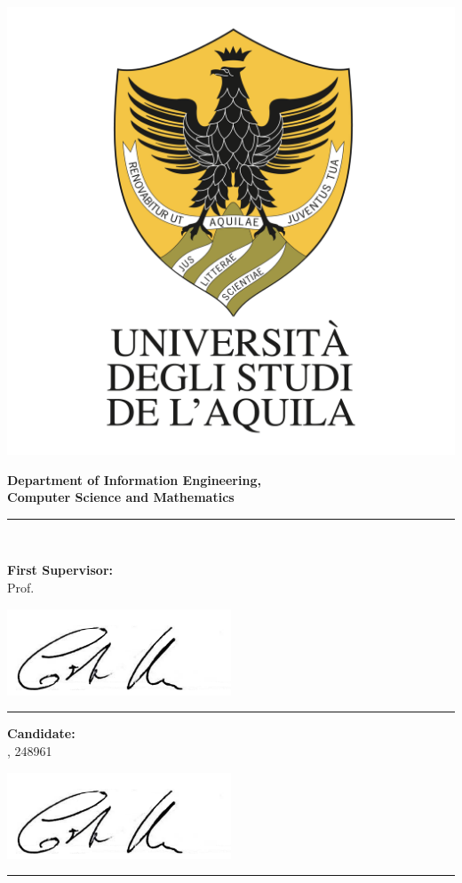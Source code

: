 \begin{titlepage}
\begin{center}

\includegraphics[width=.5\textwidth]{Images/logo}

{\large \textbf{Department of Information Engineering, \\ Computer Science and Mathematics}}

\rule{\textwidth}{1pt}\\ \smallskip

{\large {\myDegree} }

\vspace{.05\textheight}

{\Huge \myTitle}

\end{center}

\vspace{.075\textheight}

\begin{minipage}[3cm]{.4\textwidth}
\textbf{First Supervisor:} \\ \smallskip
Prof. \myProf

\smallskip
{\hspace{0.25\textwidth}\includegraphics[width=0.5\textwidth]{Images/firma_manes}}
\rule[0.4cm]{\textwidth}{1pt}
\end{minipage}
\hfill
\begin{minipage}[3cm]{.4\textwidth}
\textbf{Candidate:} \\ \smallskip
\myName, 248961

\smallskip
{\hspace{0.25\textwidth}\includegraphics[width=0.5\textwidth]{Images/firma_manes}}
\rule[.4cm]{\textwidth}{1pt}
\end{minipage}


\end{titlepage}
